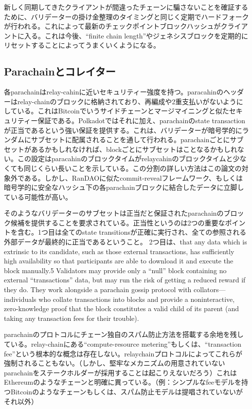 新しく同期してきたクライアントが間違ったチェーンに騙さないことを確証するために、バリデーターの掛け金整理のタイミングと同じく定期でハードフォークが行われる。これによって最新のチェックポイントブロックハッシュがクライアントに入る。これは今後、``finite
chain
length''やジェネシスブロックを定期的にリセットすることによってうまくいくようになる。

\hypertarget{parachainux3068ux30b3ux30ecux30a4ux30bfux30fc}{%
\subsection{Parachainとコレイター}\label{parachainux3068ux30b3ux30ecux30a4ux30bfux30fc}}

各parachainはrelay-cahinに近いセキュリティー強度を持つ。paracahinのヘッダーはrelay-chainのブロックに格納されており、再編成や2重支払いがないようにしている。これはBitcoinでいうサイドチェーンとマージマイニングと似たセキュリティー保証である。Polkadotではそれに加え、parachainのstate
transactionが正当であるという強い保証を提供する。これは、バリデーターが暗号学的にランダムにサブセットに配属されることを通して行われる。parachainごとにサブセットがあるかもしれなければ、blockごとにサブセットはことなるかもしれない。この設定はparacahinのブロックタイムがrelaycahinのブロックタイムと少なくても同じくらい長いことを示している。この分割の詳しい方法はこの論文の対象外である。しかし、RanDAOに似たcommit-revealフレームワーク、もしくは暗号学的に安全なハッシュ下の各parachainブロックに結合したデータに立脚している可能性が高い。

そのようなバリデーターのサブセットは正当だと保証されたparachainのブロック候補を提供することを要求されている。正当性というのは2つの重要なポイントを含む。1つ目は全てのstate
transitionsが正確に実行され、全ての参照される外部データが最終的に正当であるということ。
2つ目は、that any data which is extrinsic to its candidate, such as
those external transactions, has sufficiently high availability so that
participants are able to download it and execute the block manually.5
Validators may provide only a ``null'' block containing no external
``transactions'' data, but may run the risk of getting a reduced reward
if they do. They work alongside a parachain gossip protocol with
collators---individuals who collate transactions into blocks and provide
a noninteractive, zero-knowledge proof that the block constitutes a
valid child of its parent (and taking any transaction fees for their
trouble).

parachainのプロトコルにチェーン独自のスパム防止方法を搭載する余地を残している。relay-chainにある``compute-resource
metering''もしくは、``transaction
fee''という根本的な概念は存在しない。relaychainプロトコルによってこれらが強制されることもない。（しかし、堅牢なメカニズムの用意されていないparachainをステークホルダーが採用することは起こりえないだろう）これはEthereumのようなチェーンと明確に異っている。（例：シンプルなfeeモデルを持つBitcoinのようなチェーンもしくは、スパム防止モデルは提唱されていないがそれ以外）

